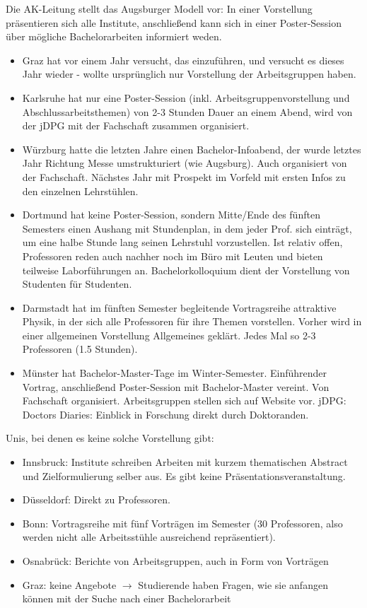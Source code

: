     Die AK-Leitung stellt das Augsburger Modell vor: In einer Vorstellung präsentieren sich alle Institute, anschließend kann sich in einer Poster-Session über mögliche Bachelorarbeiten informiert weden. \\
    \begin{itemize}
      \item Graz hat vor einem Jahr versucht, das einzuführen, und versucht es dieses Jahr wieder - wollte ursprünglich nur Vorstellung der Arbeitsgruppen haben.
      \item Karlsruhe hat nur eine Poster-Session (inkl. Arbeitsgruppenvorstellung und Abschlussarbeitsthemen) von 2-3 Stunden Dauer an einem Abend, wird von der jDPG mit der Fachschaft zusammen organisiert.
      \item Würzburg hatte die letzten Jahre einen Bachelor-Infoabend, der wurde letztes Jahr Richtung Messe umstrukturiert (wie Augsburg). Auch organisiert von der Fachschaft. Nächstes Jahr mit Prospekt im Vorfeld mit ersten Infos zu den einzelnen Lehrstühlen.
      \item Dortmund hat keine Poster-Session, sondern Mitte/Ende des fünften Semesters einen Aushang mit Stundenplan, in dem jeder Prof. sich einträgt, um eine halbe Stunde lang seinen Lehrstuhl vorzustellen. Ist relativ offen, Professoren reden auch nachher noch im Büro mit Leuten und bieten teilweise Laborführungen an. Bachelorkolloquium dient der Vorstellung von Studenten für Studenten.
      \item Darmstadt hat im fünften Semester begleitende Vortragsreihe \flqq attraktive Physik\frqq, in der sich alle Professoren für ihre Themen vorstellen. Vorher wird in einer allgemeinen Vorstellung Allgemeines geklärt. Jedes Mal so 2-3 Professoren (1.5 Stunden).
      \item Münster hat Bachelor-Master-Tage im Winter-Semester. Einführender Vortrag, anschließend Poster-Session mit Bachelor-Master vereint. Von Fachschaft organisiert. Arbeitsgruppen stellen sich auf Website vor. jDPG: \flqq Doctors Diaries\frqq: Einblick in Forschung direkt durch Doktoranden.
    \end{itemize}

    Unis, bei denen es keine solche Vorstellung gibt: \\
    \begin{itemize}
      \item Innsbruck: Institute schreiben Arbeiten mit kurzem thematischen Abstract und Zielformulierung selber aus. Es gibt keine Präsentationsveranstaltung.
      \item Düsseldorf: Direkt zu Professoren.
      \item Bonn: Vortragsreihe mit fünf Vorträgen im Semester (30 Professoren, also werden nicht alle Arbeitsstühle ausreichend repräsentiert).
      \item Osnabrück: Berichte von Arbeitsgruppen, auch in Form von Vorträgen
      \item Graz: keine Angebote $\rightarrow$ Studierende haben Fragen, wie sie anfangen können mit der Suche nach einer Bachelorarbeit
    \end{itemize}

